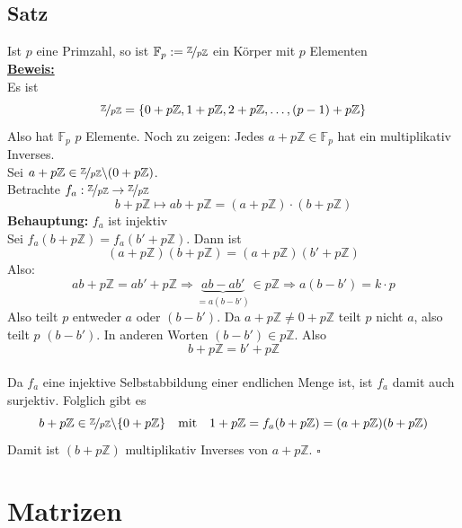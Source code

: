 \subsection{Satz} %
\label{sub:satz}
Ist $p$ eine Primzahl, so ist $\mathds{F}_p := \nicefrac{\mathds{Z}}{p \mathds{Z}}$ ein Körper mit $p$ Elementen
\vspace{\baselineskip} \\
\underline{\textbf{Beweis:}} \\
Es ist 
\[
	\nicefrac{\mathds{Z}}{p \mathds{Z}} = \{ 0 +p \mathds{Z}, 1+p \mathds{Z}, 2+ p \mathds{Z}, \ldots , (p-1)+ p \mathds{Z} \}
\]
Also hat $\mathds{F}_p$ $p$ Elemente. Noch zu zeigen: Jedes $a+p \mathds{Z} \in \mathds{F}_p$ hat ein multiplikativ Inverses.
\vspace{10pt} \\
Sei $a+ p \mathds{Z} \in \nicefrac{\mathds{Z}}{p \mathds{Z}} \backslash (0+p \mathds{Z})$. \\
Betrachte $f_a : \nicefrac{\mathds{Z}}{p \mathds{Z}} \to \nicefrac{\mathds{Z}}{p \mathds{Z}}$
\[
b+p \mathds{Z} \mapsto ab + p \mathds{Z} = (a+p \mathds{Z}) \cdot (b+p \mathds{Z})
\]
\textbf{Behauptung:} $f_a$ ist injektiv \\
Sei $f_a (b+p \mathds{Z})= f_a (b' + p \mathds{Z})$. Dann ist 
\[
	(a+p \mathds{Z})(b+p \mathds{Z})=(a+p \mathds{Z})(b'+p \mathds{Z})
\]
Also: 
\[
	ab+ p \mathds{Z} = ab' + p \mathds{Z} \Longrightarrow \underbrace{ab-ab'}_{=a(b-b')} 
	\in p \mathds{Z} \Longrightarrow a(b-b')=k \cdot p
\]
Also teilt $p$ entweder $a$ oder $(b-b')$. Da $a+p \mathds{Z} \not= 0 + p \mathds{Z}$ teilt 
$p$ nicht $a$, also teilt $p$ $(b-b')$. In anderen Worten $(b-b') \in p \mathds{Z}$. Also
\[
	b+ p \mathds{Z} = b' + p \mathds{Z}
\]
\vspace{\baselineskip} \\
Da $f_a$ eine injektive Selbstabbildung einer endlichen Menge ist, ist $f_a$ damit auch surjektiv.
Folglich gibt es 
\[
	b+p \mathds{Z} \in \nicefrac{\mathds{Z}}{p \mathds{Z}} \backslash \{ 0+ p \mathds{Z} \} \quad \text{mit} \quad 
	1+p \mathds{Z} = f_a (b+p \mathds{Z}) = (a+p \mathds{Z})(b+p \mathds{Z})
\]
Damit ist $(b+p \mathds{Z})$ multiplikativ Inverses von $a+p \mathds{Z}$. \hfill \( \square \)

\section{Matrizen} %
\label{sec:matrizen}

